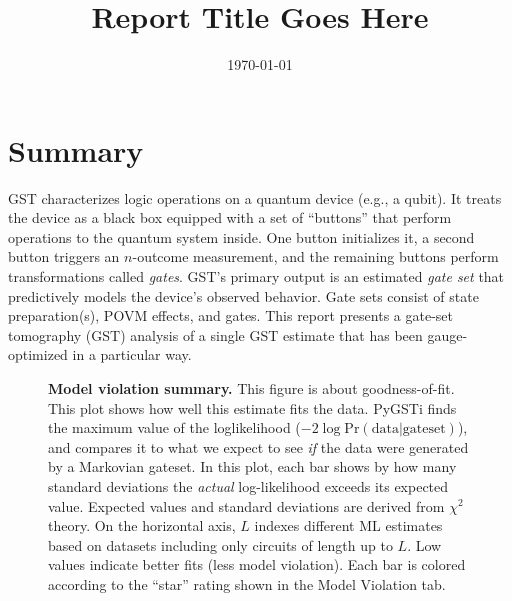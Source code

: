\documentclass{article}[11pt]
\newcommand{\putfield}[2]{#2}
\begin{document}
\title{\putfield{title}{Report Title Goes Here}}
\date{\vspace{-1cm}\today}

\begingroup
\let\center\flushleft
\let\endcenter\endflushleft
\maketitle
\endgroup

\tableofcontents

\section{Summary}
GST characterizes logic operations on a quantum device (e.g., a qubit).  It treats the device as a black box equipped with a set of ``buttons'' that perform operations to the quantum system inside.  One button initializes it, a second button triggers an $n$-outcome measurement, and the remaining buttons perform transformations called \emph{gates}.  %
GST's primary output is an estimated \emph{gate set} that predictively models the device's observed behavior.  Gate sets consist of state preparation(s), POVM effects, and gates. This report presents a gate-set tomography (GST) analysis of a single GST estimate that has been gauge-optimized in a particular way.

\begin{figure}
  \begin{center}
    \begin{adjustbox}{max width=\textwidth}
      \putfield{final_model_fit_progress_bar_plot_sum}{}
    \end{adjustbox}
    \caption{\textbf{Model violation summary.} This figure is about goodness-of-fit.  This plot shows how well this estimate fits the data.    PyGSTi finds the maximum value of the loglikelihood ($-2\log\mathrm{Pr(data|gateset)}$), and compares it to what we expect to see \emph{if} the data were generated by a Markovian gateset.  In this plot, each bar shows by how many standard deviations the \emph{actual} log-likelihood exceeds its expected value.  Expected values and standard deviations are derived from $\chi^2$ theory.  On the horizontal axis, $L$ indexes different ML estimates based on datasets including only circuits of length up to $L$.  Low values indicate better fits (less model violation).  Each bar is colored according to the ``star'' rating shown in the Model Violation tab.\label{final_model_fit_progress_bar_plot_sum}}
  \end{center}
\end{figure}
\end{document}
